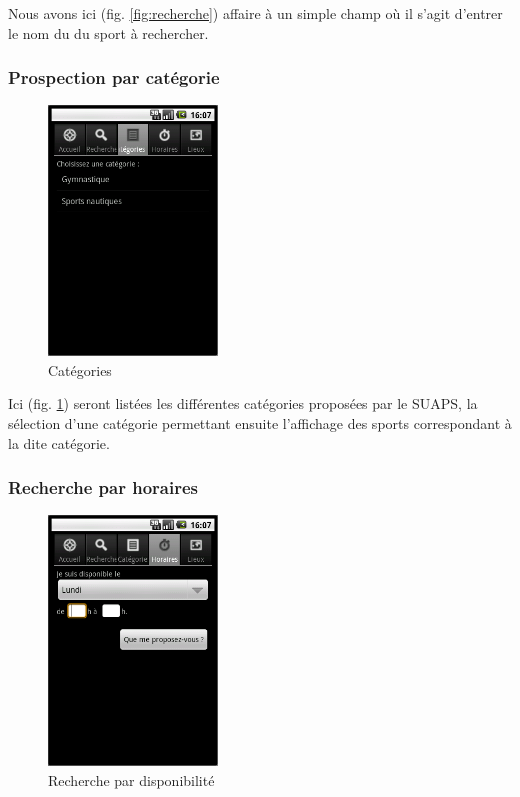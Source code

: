 \documentclass[french, titlepage, 11pt, a4paper]{article}
\begin{document}
		Nous avons ici (fig. \ref{fig:recherche}) affaire à un simple champ où il s'agit d'entrer le nom du
		du sport à rechercher.

		\subsubsection{Prospection par catégorie}

		\begin{figure}[htb]
			\centering
			\includegraphics[width=0.4\textwidth]{categories.png}
			\caption{Catégories}
			\label{fig:categories}
		\end{figure}

		Ici (fig. \ref{fig:categories}) seront listées les différentes catégories proposées par le SUAPS, la
		sélection d'une catégorie permettant ensuite l'affichage des sports
		correspondant à la dite catégorie.

		\subsubsection{Recherche par horaires}

		\begin{figure}[htb]
			\centering
			\includegraphics[width=0.4\textwidth]{horaires.png}
			\caption{Recherche par disponibilité}
			\label{fig:horaires}
		\end{figure}
\end{document}

